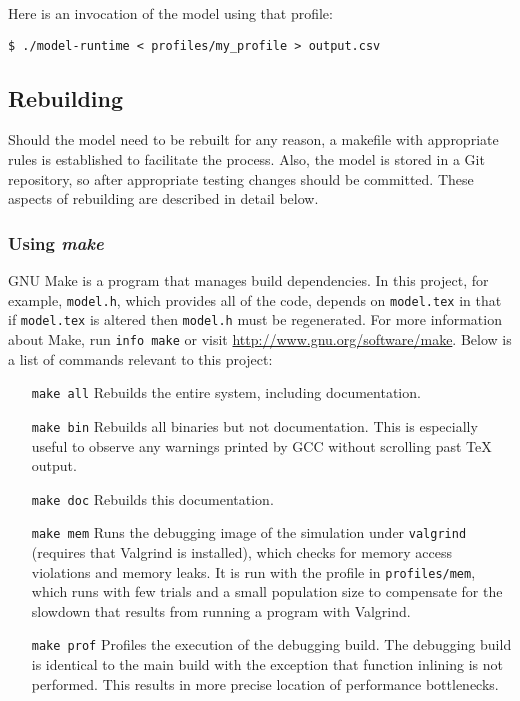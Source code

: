 \documentclass{article}
\begin{document}
        Here is an invocation of the model using that profile:

        \begin{verbatim}
$ ./model-runtime < profiles/my_profile > output.csv
        \end{verbatim}

    \subsection{Rebuilding}
      \label{sec:rebuilding}
    
      Should the model need to be rebuilt for any reason, a makefile with
      appropriate rules is established to facilitate the process. Also, the
      model is stored in a Git repository, so after appropriate testing changes
      should be committed. These aspects of rebuilding are described in detail
      below.

      \subsubsection{Using {\em make}}
        \label{sec:make}

        GNU Make is a program that manages build dependencies. In this project,
        for example, \verb|model.h|, which provides all of the code, depends on
        \verb|model.tex| in that if \verb|model.tex| is altered then
        \verb|model.h| must be regenerated. For more information about Make, run
        \verb|info make| or visit \url{http://www.gnu.org/software/make}. Below
        is a list of commands relevant to this project:

        \begin{enumerate}
          \item[\tt make all]
          Rebuilds the entire system, including documentation.

          \item[\tt make bin]
          Rebuilds all binaries but not documentation. This is especially useful
          to observe any warnings printed by GCC without scrolling past \TeX
          output.

          \item[\tt make doc]
          Rebuilds this documentation.

          \item[\tt make mem]
          Runs the debugging image of the simulation under \verb|valgrind|
          (requires that Valgrind is installed), which checks for memory access
          violations and memory leaks. It is run with the profile in
          \verb|profiles/mem|, which runs with few trials and a small population
          size to compensate for the slowdown that results from running a
          program with Valgrind.

          \item[\tt make prof]
          Profiles the execution of the debugging build. The debugging build is
          identical to the main build with the exception that function inlining
          is not performed. This results in more precise location of performance
          bottlenecks.
        \end{enumerate}
\end{document}
